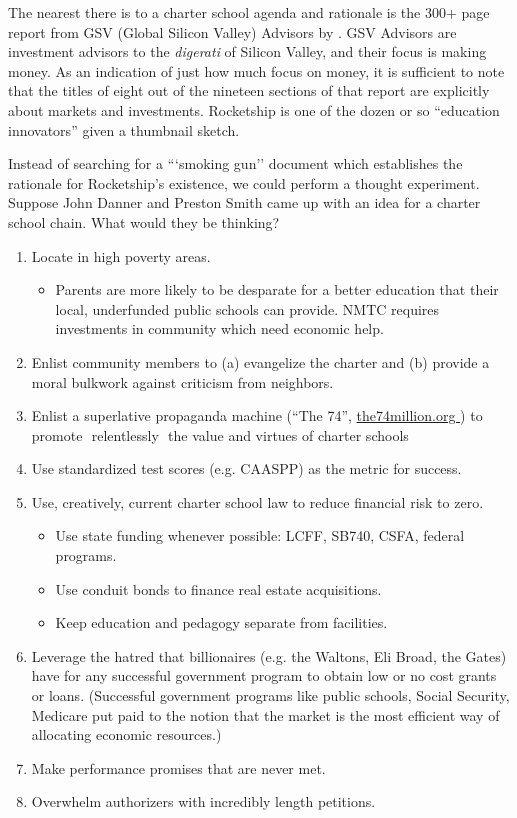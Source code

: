 The nearest there is to a charter school agenda and rationale is the 300+ page report from GSV (Global Silicon Valley) Advisors  by \citeauthor{Moe.etal2012}. GSV Advisors are investment advisors to the \emph{digerati} of Silicon Valley, and their focus is making money. As an indication of just how much  focus on money, it is sufficient to note that the titles of eight out of the nineteen sections of that report are explicitly about markets and investments. Rocketship is one of the dozen or so ``education innovators'' given a thumbnail sketch. %

Instead of searching for a ```smoking gun'' document which establishes the rationale for Rocketship's existence, we could perform a thought experiment. Suppose John Danner and Preston Smith came up with an idea for a charter school chain. What would they be thinking?
\begin{enumerate}
  \item Locate in high poverty areas.
  \begin{itemize}
    \item Parents are more likely to be desparate for a better education that their local, underfunded public schools can provide.
    NMTC requires investments in community which need economic help.
  \end{itemize}
  \item Enlist community members to (a) evangelize the charter and (b) provide a moral bulkwork against criticism from neighbors.
  \item Enlist a superlative propaganda machine (``The 74'', \url{the74million.org }) to promote ­ relentlessly ­ the value and virtues of charter schools
  \item Use standardized test scores (e.g. CAASPP) as the metric for success.
  \item Use, creatively, current charter school law to reduce financial risk to zero.
  \begin{itemize}
    \item Use state funding whenever possible: LCFF, SB740, CSFA, federal programs.
    \item Use conduit bonds to finance real estate acquisitions.
    \item Keep education and pedagogy separate from facilities.
  \end{itemize}
  \item Leverage the hatred that billionaires (e.g. the Waltons, Eli Broad, the Gates) have for any successful government program to obtain low or no cost grants or loans. (Successful government programs like public schools, Social Security, Medicare put paid to the notion that the market is the most efficient way of allocating economic resources.)
  \item Make performance promises that are never met.
  \item Overwhelm authorizers with incredibly length petitions.
\end{enumerate}

